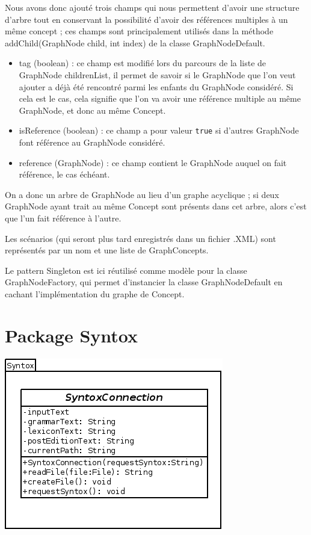 \documentclass[12pt]{report}
\begin{document}
Nous avons donc ajouté trois champs qui nous permettent d'avoir une structure d'arbre tout en conservant la possibilité d'avoir des références multiples à un même concept ; ces champs sont principalement utilisés dans la méthode addChild(GraphNode child, int index) de la classe GraphNodeDefault.
\begin{itemize}
\item tag (boolean) : ce champ est modifié lors du parcours de la liste de GraphNode childrenList, il permet de savoir si le GraphNode que l'on veut ajouter a déjà été rencontré parmi les enfants du GraphNode considéré. Si cela est le cas, cela signifie que l'on va avoir une référence multiple au même GraphNode, et donc au même Concept.
\item isReference (boolean) : ce champ a pour valeur \texttt{true} si d'autres GraphNode font référence au GraphNode considéré.
\item reference (GraphNode) : ce champ contient le GraphNode auquel on fait référence, le cas échéant.
\end{itemize}

On a donc un arbre de GraphNode au lieu d'un graphe acyclique ; si deux GraphNode ayant trait au même Concept sont présents dans cet arbre, alors c'est que l'un fait référence à l'autre.

\bigskip 
Les scénarios (qui seront plus tard enregistrés dans un fichier .XML) sont représentés par un nom et une liste de GraphConcepts.

\bigskip
Le pattern Singleton est ici réutilisé comme modèle pour la classe GraphNodeFactory, qui permet d'instancier la classe GraphNodeDefault en cachant l'implémentation du graphe de Concept.

\section{Package Syntox}
 
\begin{center}
\includegraphics[scale=0.6]{diversuml/SyntoxConnection.png}
\end{center}
\end{document}
